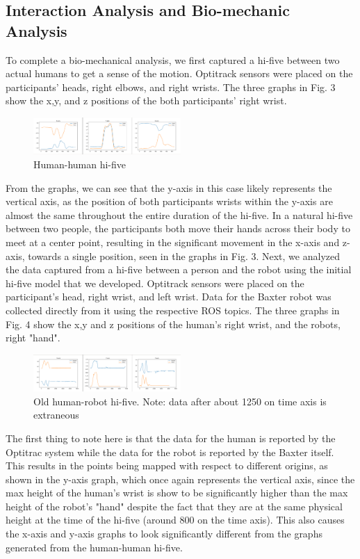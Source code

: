\documentclass[letterpaper, 10 pt, conference]{ieeeconf}  %
\begin{document}
\subsection{Interaction Analysis and Bio-mechanic Analysis}

To complete a bio-mechanical analysis, we first captured a hi-five between two actual humans to get a sense of the motion. Optitrack sensors were placed on the participants' heads, right elbows, and right wrists. The three graphs in Fig. 3 show the x,y, and z positions of the both participants' right wrist. 
\begin{figure}[h]
\centering
\includegraphics[width=0.5\textwidth]{biomechanics.png}
\caption{Human-human hi-five}
\end{figure} 
\newline
\indent From the graphs, we can see that the y-axis in this case likely represents the vertical axis, as the position of both participants wrists within the y-axis are almost the same throughout the entire duration of the hi-five. In a natural hi-five between two people, the participants both move their hands across their body to meet at a center point, resulting in the significant movement in the x-axis and z-axis, towards a single position, seen in the graphs in Fig. 3.
\newline
\indent Next, we analyzed the data captured from a hi-five between a person and the robot using the initial hi-five model that we developed. Optitrack sensors were placed on the participant's head, right wrist, and left wrist. Data for the Baxter robot was collected directly from it using the respective ROS topics. The three graphs in Fig. 4 show the x,y and z positions of the human's right wrist, and the robots, right "hand".
\begin{figure}[h]
\centering
\includegraphics[width=0.5\textwidth]{oldfive.png}
\caption{Old human-robot hi-five. Note: data after about 1250 on time axis is extraneous}
\end{figure}
\newline
\indent The first thing to note here is that the data for the human is reported by the Optitrac system while the data for the robot is reported by the Baxter itself. This results in the points being mapped with respect to different origins, as shown in the y-axis graph, which once again represents the vertical axis, since the max height of the human's wrist is show to be significantly higher than the max height of the robot's "hand" despite the fact that they are at the same physical height at the time of the hi-five (around 800 on the time axis). This also causes the x-axis and y-axis graphs to look significantly different from the graphs generated from the human-human hi-five. 
\end{document}
